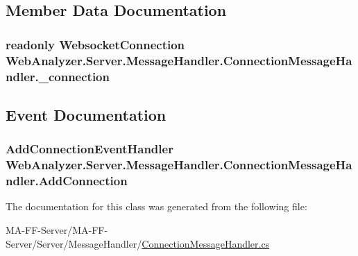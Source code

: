 \subsection{Member Data Documentation}
\hypertarget{class_web_analyzer_1_1_server_1_1_message_handler_1_1_connection_message_handler_ac9450ddba733401319fb68606dcfd3a3}{}
\subsubsection[{\+\_\+connection}]{\setlength{\rightskip}{0pt plus 5cm}readonly {\bf Websocket\+Connection} Web\+Analyzer.\+Server.\+Message\+Handler.\+Connection\+Message\+Handler.\+\_\+connection\hspace{0.3cm}{\ttfamily [private]}}\label{class_web_analyzer_1_1_server_1_1_message_handler_1_1_connection_message_handler_ac9450ddba733401319fb68606dcfd3a3}


\subsection{Event Documentation}
\hypertarget{class_web_analyzer_1_1_server_1_1_message_handler_1_1_connection_message_handler_a10b402c23b0015efb4b3643a064e7f09}{}
\subsubsection[{Add\+Connection}]{\setlength{\rightskip}{0pt plus 5cm}Add\+Connection\+Event\+Handler Web\+Analyzer.\+Server.\+Message\+Handler.\+Connection\+Message\+Handler.\+Add\+Connection}\label{class_web_analyzer_1_1_server_1_1_message_handler_1_1_connection_message_handler_a10b402c23b0015efb4b3643a064e7f09}


The documentation for this class was generated from the following file\+:\begin{DoxyCompactItemize}
\item 
M\+A-\/\+F\+F-\/\+Server/\+M\+A-\/\+F\+F-\/\+Server/\+Server/\+Message\+Handler/\hyperlink{_connection_message_handler_8cs}{Connection\+Message\+Handler.\+cs}\end{DoxyCompactItemize}
